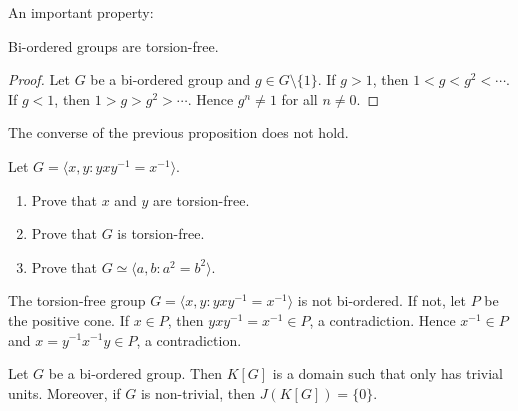 An important property:

\begin{proposition}
	\label{pro:BOsintorsion}
	Bi-ordered groups are torsion-free.
\end{proposition}

\begin{proof}
	Let $G$ be a bi-ordered group and $g\in G\setminus\{1\}$. 
	If $g>1$, then
	$1<g<g^2<\cdots$. If $g<1$, then $1>g>g^2>\cdots$. Hence $g^n\ne 1$ 
	for all $n\ne 0$. 
\end{proof}

The converse of the previous proposition does not hold. 

\begin{exercise}
Let $G=\langle x,y:yxy^{-1}=x^{-1}\rangle$. 
\begin{enumerate}
    \item Prove that $x$ and $y$ are torsion-free. 
    \item Prove that $G$ is torsion-free. 
    \item Prove that $G\simeq \langle a,b:a^2=b^2\rangle$.
\end{enumerate}
\end{exercise}



\begin{example}
	The torsion-free group $G=\langle x,y:yxy^{-1}=x^{-1}\rangle$ is not bi-ordered. 
	If not, let $P$ 
	be the positive cone. If $x\in P$, 
	then $yxy^{-1}=x^{-1}\in P$, a contradiction. Hence $x^{-1}\in P$
	and $x=y^{-1}x^{-1}y\in P$, a contradiction.
\end{example}

\begin{theorem}
	\label{thm:BO}
	Let $G$ be a bi-ordered group. Then $K[G]$ is a domain such that
	only has trivial units. Moreover, if $G$ is non-trivial, 
	then $J(K[G])=\{0\}$. 
\end{theorem}

